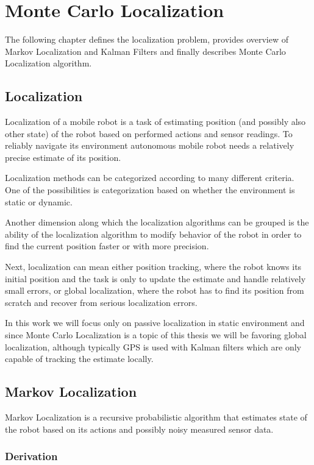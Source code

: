 \chapter{Monte Carlo Localization}
\label{chap:mcl}

The following chapter defines the localization problem, provides overview
of Markov Localization and Kalman Filters and finally describes
Monte Carlo Localization algorithm.

\section{Localization}
Localization of a mobile robot is a task of estimating position (and possibly
also other state) of the robot based on performed actions and sensor readings.
To reliably navigate its environment autonomous mobile robot needs
a relatively precise estimate of its position.

Localization methods can be categorized according to many different criteria.
One of the possibilities is categorization based on whether the environment is static
or dynamic.

Another dimension along which the localization algorithms can be grouped
is the ability of the localization algorithm to modify behavior of the robot
in order to find the current position faster or with more precision.

Next, localization can mean either position tracking, where the robot knows its initial
position and the task is only to update the estimate and handle relatively small
errors, or global localization, where the robot has to find its position from scratch
and recover from serious localization errors.

In this work we will focus only on passive localization in static environment and
since Monte Carlo Localization is a topic of this thesis we will be favoring
global localization, although typically GPS is used with Kalman filters
which are only capable of tracking the estimate locally.

\section{Markov Localization}

Markov Localization \cite{fox98,diard03} is a recursive probabilistic
algorithm that estimates state of the robot based on its
actions and possibly noisy measured sensor data.

\subsection{Derivation}

